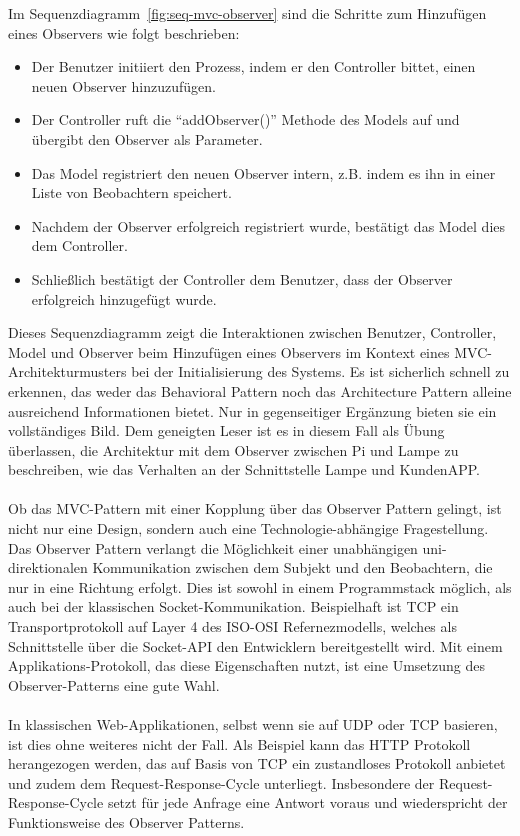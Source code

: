 Im Sequenzdiagramm~\ref{fig:seq-mvc-observer} sind die Schritte zum Hinzufügen eines Observers wie folgt beschrieben:
\begin{itemize}
\item Der Benutzer initiiert den Prozess, indem er den Controller bittet, einen neuen Observer hinzuzufügen.
\item Der Controller ruft die \enquote{addObserver()} Methode des Models auf und übergibt den Observer als Parameter.
\item Das Model registriert den neuen Observer intern, z.B. indem es ihn in einer Liste von Beobachtern speichert.
\item Nachdem der Observer erfolgreich registriert wurde, bestätigt das Model dies dem Controller.
\item Schließlich bestätigt der Controller dem Benutzer, dass der Observer erfolgreich hinzugefügt wurde.
\end{itemize}
Dieses Sequenzdiagramm zeigt die Interaktionen zwischen Benutzer, Controller, Model und Observer beim Hinzufügen eines Observers im Kontext eines MVC-Architekturmusters bei der Initialisierung des Systems. Es ist sicherlich schnell zu erkennen, das weder das Behavioral Pattern noch das Architecture Pattern alleine ausreichend Informationen bietet. Nur in gegenseitiger Ergänzung bieten sie ein vollständiges Bild. Dem geneigten Leser ist es in diesem Fall als Übung überlassen, die Architektur mit dem Observer zwischen Pi und Lampe zu beschreiben, wie das Verhalten an der Schnittstelle Lampe und KundenAPP. 
\\\\
Ob das MVC-Pattern mit einer Kopplung über das Observer Pattern gelingt, ist nicht nur eine Design, sondern auch eine Technologie-abhängige Fragestellung. Das Observer Pattern verlangt die Möglichkeit einer unabhängigen uni-direktionalen Kommunikation zwischen dem Subjekt und den Beobachtern, die nur in eine Richtung erfolgt. Dies ist sowohl in einem Programmstack möglich, als auch bei der klassischen Socket-Kommunikation. Beispielhaft ist TCP ein Transportprotokoll auf Layer 4 des ISO-OSI Refernezmodells, welches als Schnittstelle über die Socket-API den Entwicklern bereitgestellt wird. Mit einem Applikations-Protokoll, das diese Eigenschaften nutzt, ist eine Umsetzung des Observer-Patterns eine gute Wahl. 
\\\\
In klassischen Web-Applikationen, selbst wenn sie auf UDP oder TCP basieren, ist dies ohne weiteres nicht der Fall. Als Beispiel kann das HTTP Protokoll herangezogen werden, das auf Basis von TCP ein zustandloses Protokoll anbietet und zudem dem Request-Response-Cycle unterliegt. Insbesondere der Request-Response-Cycle setzt für jede Anfrage eine Antwort voraus und wiederspricht der Funktionsweise des Observer Patterns.
